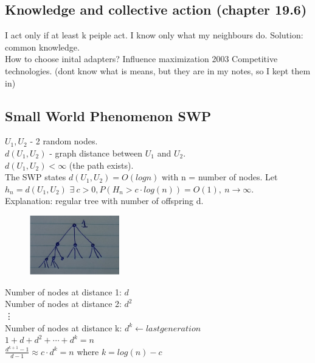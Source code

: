 \documentclass[12pt]{scrartcl}
\begin{document}
\subsection{Knowledge and collective action (chapter 19.6)}
I act only if at least k peiple act. I know only what my neighbours do. Solution: common knowledge.\\

How to choose inital adapters? Influence maximization 2003
Competitive technologies. (dont know what is means, but they are in my notes, so I kept them in)\\

\subsection{Small World Phenomenon SWP}
$U_{1}, U_{2}$ - 2 random nodes.\\
$d(U_{1}, U_{2})$ - graph distance between $U_{1}$ and $U_{2}$.\\
$d(U_{1}, U_{2}) < \infty$ (the path exists).\\

\noindent The SWP states $d(U_{1}, U_{2}) = O(log n)$ with n = number of nodes. Let $h_{n} = d(U_{1}, U_{2})$
$\exists\ c>0, P(H_{n} > c\cdot log(n)) = O(1),\ n\rightarrow \infty$.\\

\noindent Explanation: regular tree with number of offspring d.
\begin{figure}[h]
	\centering
	\includegraphics[width=0.35\textwidth]{./images/fig7.jpg} 
\end{figure}


\noindent Number of nodes at distance 1: $d$\\
Number of nodes at distance 2: $d^{2}$\\
\vdots						 \\
Number of nodes at distance k: $d^{k} \leftarrow last generation$\\

\noindent $1 + d + d^{2} + \cdots + d^{k} = n$\\
$\frac{d^{k+1}-1}{d-1} \approx c\cdot d^{k} = n$ where $k = log(n) - c$\newline\newline\newline
\end{document}
